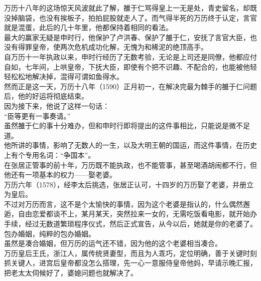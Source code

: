 \begin{multicols}{\theparacolNo}
万历十八年的这场惊天风波就此了解，雒于仁骂得皇上一无是处，青史留名，却既没掉脑袋，也没有挨板子，拍拍屁股就走人了。而气得半死的万历终于认定，言官就是混蛋，此后的几十年里，他都保持着相同的看法。\\

最大的赢家无疑是申时行，他保护了卢洪春、保护了雒于仁，安抚了言官大臣，也没有得罪皇帝，使两次危机成功化解，无愧为和稀泥的绝顶高手。\\

自万历十一年执政以来，申时行经历了无数考验，无论是上司还是同僚，他都应付自如，七年间，上哄皇帝，下抚大臣，即使有个把不识趣、不配合的，也能被他轻轻松松地解决掉，混得可谓如鱼得水。\\

然而正是这一天，万历十八年（1590）正月初一，在解决完最为棘手的雒于仁问题后，他的好运将彻底结束。\\

因为接下来，他说了这样一句话：\\

“臣等更有一事奏请。”\\

虽然雒于仁的事十分难办，但和申时行即将提出的这件事相比，只能说是微不足道。\\

他所讲的事情，影响了无数人的一生，以及大明王朝的国运，而这件事情，在历史上有个专用名词：“争国本”。\\

在张居正管事的前十年，万历既不能执政，也不能管事，甚至喝酒胡闹都不行，但他还有一项基本的权力——娶老婆。\\

万历六年（1578），经李太后挑选，张居正认可，十四岁的万历娶了老婆，并册立为皇后。\\

不过对万历而言，这不是个太愉快的事情，因为这个老婆是指认的，什么偶然邂逅，自由恋爱都谈不上，某月某天，突然拉来一女的，无需吃饭看电影，就开始办手续，经过无数道繁琐程序仪式，然后正式宣告，从今以后，她就是你的老婆了。\\

包办婚姻，纯粹的包办婚姻。\\

虽然是凑合婚姻，但万历的运气还不错，因为他的这个老婆相当凑合。\\

万历皇后王氏，浙江人，属传统贤妻型，而且为人乖巧，定位明确，善于关键时刻抓关键人，进宫后皇帝都没怎么搭理，先一心一意服侍皇帝他妈，早请示晚汇报，把老太太伺候好了，婆媳问题也就解决了。\\


\end{multicols}
